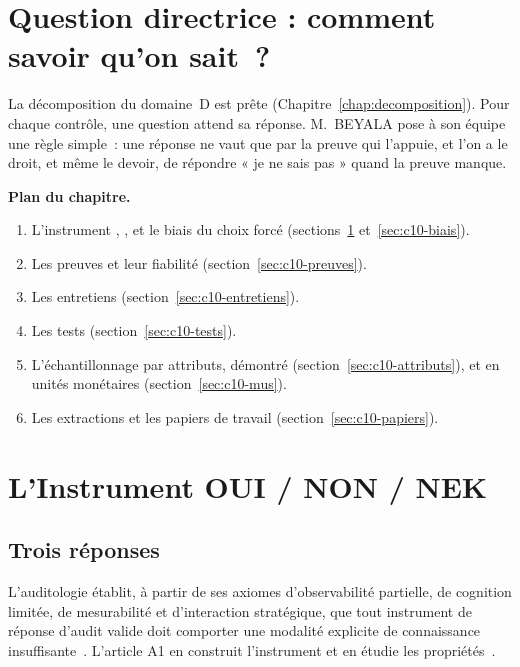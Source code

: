 \bigskip

\section*{Question directrice : comment savoir qu'on sait~?}

La décomposition du domaine~D est prête (Chapitre~\ref{chap:decomposition}).
Pour chaque contrôle, une question attend sa réponse. M.~BEYALA pose à son
équipe une règle simple~: une réponse ne vaut que par la preuve qui
l'appuie, et l'on a le droit, et même le devoir, de répondre « je ne sais
pas » quand la preuve manque.

\medskip
\textbf{Plan du chapitre.}
\begin{enumerate}
    \item L'instrument \OUI{}, \NON{}, \NEK{} et le biais du choix forcé
          (sections~\ref{sec:c10-instrument} et~\ref{sec:c10-biais}).
    \item Les preuves et leur fiabilité (section~\ref{sec:c10-preuves}).
    \item Les entretiens (section~\ref{sec:c10-entretiens}).
    \item Les tests (section~\ref{sec:c10-tests}).
    \item L'échantillonnage par attributs, démontré
          (section~\ref{sec:c10-attributs}), et en unités monétaires
          (section~\ref{sec:c10-mus}).
    \item Les extractions et les papiers de travail
          (section~\ref{sec:c10-papiers}).
\end{enumerate}

\separateur

\section{L'Instrument OUI / NON / NEK}
\label{sec:c10-instrument}

\subsection{Trois réponses}

L'auditologie établit, à partir de ses axiomes d'observabilité partielle, de
cognition limitée, de mesurabilité et d'interaction stratégique, que tout
instrument de réponse d'audit valide doit comporter une modalité explicite
de connaissance insuffisante~\cite{minka2026auditologie}. L'article A1 en
construit l'instrument et en étudie les propriétés~\cite{minka2026nek}.

